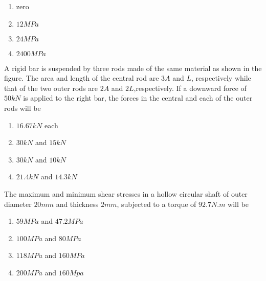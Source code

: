 	\begin{enumerate}
                \item zero
                \item $12 MPa$
                \item $24 MPa$
                \item $2400 MPa$
        \end{enumerate}
\item A rigid bar is suspended by three rods made of the same material as shown in the figure. The area and length of the central rod are $3A$ and $L$, respectively while that of the two outer rods are $2A$ and $2L$,respectively. If a downward force of $50 kN$ is applied to the right bar, the forces in the central and each of the outer rods will be\\
	\begin{center}	 \end{center}
		\begin{enumerate}
                \item $16.67 kN$ each
                \item $30 kN$ and $15 kN$
                \item $30 kN$ and $10 kN$
                \item $21.4 kN$ and $14.3 kN$
        \end{enumerate}
\item The maximum and minimum shear stresses in a hollow circular shaft of outer diameter $20 mm$ and thickness $2 mm$, subjected to a torque of $92.7 N.m$ will be
	\begin{enumerate}
                \item $59 MPa$ and $47.2MPa$
                \item $100 MPa$ and $80 MPa$
                \item $118 MPa$ and $160 MPa$
                \item $200 MPa$ and $160 Mpa$
        \end{enumerate}
